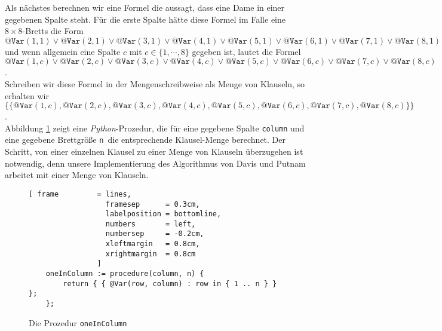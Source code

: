 Als nächstes berechnen wir eine Formel die aussagt, dass  eine Dame in einer gegebenen
Spalte steht.  Für die erste Spalte hätte diese Formel im Falle eine $8 \times 8$-Bretts die Form 
\\[0.2cm]
\hspace*{1.3cm}
$\texttt{@Var}(1,1) \vee \texttt{@Var}(2,1) \vee \texttt{@Var}(3,1) \vee \texttt{@Var}(4,1) \vee \texttt{@Var}(5,1) \vee
\texttt{@Var}(6,1) \vee \texttt{@Var}(7,1) \vee \texttt{@Var}(8,1)$
\\[0.2cm]
und wenn allgemein eine Spalte $c$ mit $c \in \{1,\cdots,8\}$ gegeben ist, lautet die Formel
\\[0.2cm]
\hspace*{1.3cm}
$\texttt{@Var}(1,c) \vee \texttt{@Var}(2,c) \vee \texttt{@Var}(3,c) \vee \texttt{@Var}(4,c) \vee \texttt{@Var}(5,c) \vee
\texttt{@Var}(6,c) \vee \texttt{@Var}(7,c) \vee \texttt{@Var}(8,c)$.
\\[0.2cm]
Schreiben wir diese Formel in der Mengenschreibweise als Menge von Klauseln, so erhalten wir
\\[0.2cm]
\hspace*{1.3cm}
$\bigl\{ \{\texttt{@Var}(1,c) , \texttt{@Var}(2,c) , \texttt{@Var}(3,c) , \texttt{@Var}(4,c) , \texttt{@Var}(5,c) ,
\texttt{@Var}(6,c) , \texttt{@Var}(7,c) , \texttt{@Var}(8,c) \}\bigr\}$.
\\[0.2cm]
Abbildung \ref{fig:oneInColumn} zeigt eine \textsl{Python}-Prozedur, die für eine gegebene Spalte
\texttt{column} und eine gegebene Brettgröße \texttt{n }die entsprechende Klausel-Menge berechnet.
Der Schritt, von einer einzelnen Klausel 
zu einer Menge von Klauseln überzugehen ist notwendig, denn unsere Implementierung des Algorithmus von
Davis und Putnam arbeitet mit einer Menge von Klauseln.

\begin{figure}[!ht]
  \centering
\begin{Verbatim}[ frame         = lines, 
                  framesep      = 0.3cm, 
                  labelposition = bottomline,
                  numbers       = left,
                  numbersep     = -0.2cm,
                  xleftmargin   = 0.8cm,
                  xrightmargin  = 0.8cm
                ]
    oneInColumn := procedure(column, n) {
        return { { @Var(row, column) : row in { 1 .. n } } };
    };
\end{Verbatim}
\vspace*{-0.3cm}
  \caption{Die Prozedur \texttt{oneInColumn}}
  \label{fig:oneInColumn}
\end{figure}

